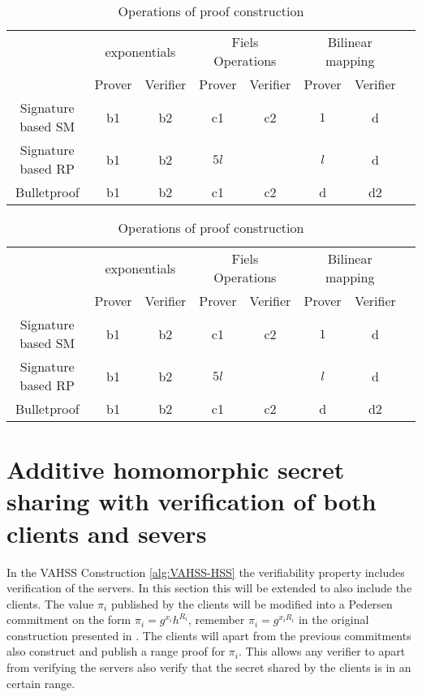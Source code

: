 \begin{table}[H]
\label{tab:compare}
\caption{Operations of proof construction}
\begin{tabular}{| *{8}{c|}}
			 \hline
    										&   \multicolumn{2}{c|}{exponentials} 	& \multicolumn{2}{c|}{Fiels Operations}    & \multicolumn{2}{c|}{Bilinear mapping }        	\\
&  Prover & Verifier & Prover & Verifier&	Prover & Verifier 						 	\\ \hline
  Signature based SM  			&   b1  &   b2  											&   c1  &   c2    & $1$							 &d						\\ \hline 
  Signature based RP  	&   b1  &   b2 							&   $5l$ &     	 & $l$	& d	 										\\ \hline
  Bulletproof   						& b1  &   b2 												&   c1 &   c2     & d					&d2								\\ \hline	
\end{tabular}
 \end{table}
	
	\begin{table}[H]
\label{tab:compare}
\caption{Operations of proof construction}
\begin{tabular}{| *{8}{c|}}
			 \hline
    										&   \multicolumn{2}{c|}{exponentials} 	& \multicolumn{2}{c|}{Fiels Operations}    & \multicolumn{2}{c|}{Bilinear mapping }        	\\
&  Prover & Verifier & Prover & Verifier&	Prover & Verifier 						 	\\ \hline
  Signature based SM  			&   b1  &   b2  											&   c1  &   c2    & $1$							 &d						\\ \hline 
  Signature based RP  	&   b1  &   b2 							&   $5l$ &     	 & $l$	& d	 										\\ \hline
  Bulletproof   						& b1  &   b2 												&   c1 &   c2     & d					&d2								\\ \hline	
\end{tabular}
 \end{table}
	

\section{Additive homomorphic secret sharing with verification of both clients and severs }
In the VAHSS Construction \ref{alg:VAHSS-HSS} the verifiability property includes verification of the servers. In this section this will be extended to also include the clients. The value $\pi_i$ published by the clients will be modified into a Pedersen commitment on the form $\pi_i = g^{x_i}h^{R_i}$, remember $\pi_i=g^{x_iR_i}$ in the original construction presented in \cite{SumItUp}. The clients will apart from the previous commitments  also construct and publish a range proof for $\pi_i$. This allows any verifier to apart from verifying the servers also verify that the secret shared by the clients is in an certain range.  


